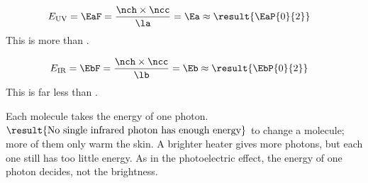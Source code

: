 \begin{abcliste}
\abc
\begin{align}
 E_\text{UV} &= \EaF = \frac{\nch\times\ncc}{\la} = \Ea \approx \result{\EaP{0}{2}}
\end{align}
This is more than \EcO.

\abc
\begin{align}
 E_\text{IR} &= \EbF = \frac{\nch\times\ncc}{\lb} = \Eb \approx \result{\EbP{0}{2}}
\end{align}
This is far less than \EcO.

\abc Each molecule takes the energy of one photon. $\result{\text{No single infrared photon has enough energy}}$ to change a molecule; more of them only warm the skin. A brighter heater gives more photons, but each one still has too little energy. As in the photoelectric effect, the energy of one photon decides, not the brightness.
\end{abcliste}
